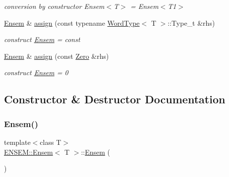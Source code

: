 \begin{DoxyCompactItemize}
\begin{DoxyCompactList}\small\item\em conversion by constructor Ensem$<$\+T$>$ = Ensem$<$\+T1$>$ \end{DoxyCompactList}\item 
\mbox{\hyperlink{classENSEM_1_1Ensem}{Ensem}} \& \mbox{\hyperlink{classENSEM_1_1Ensem_ae31c239c3dc966eaad70ec90489f5476}{assign}} (const typename \mbox{\hyperlink{structENSEM_1_1WordType}{Word\+Type}}$<$ T $>$\+::Type\+\_\+t \&rhs)
\begin{DoxyCompactList}\small\item\em construct \mbox{\hyperlink{classENSEM_1_1Ensem}{Ensem}} = const \end{DoxyCompactList}\item 
\mbox{\hyperlink{classENSEM_1_1Ensem}{Ensem}} \& \mbox{\hyperlink{classENSEM_1_1Ensem_a140d8bb94d07a0abfb2ad396df63c625}{assign}} (const \mbox{\hyperlink{structENSEM_1_1Zero}{Zero}} \&rhs)
\begin{DoxyCompactList}\small\item\em construct \mbox{\hyperlink{classENSEM_1_1Ensem}{Ensem}} = 0 \end{DoxyCompactList}\end{DoxyCompactItemize}


\subsection{Constructor \& Destructor Documentation}
\mbox{\label{classENSEM_1_1Ensem_a8875b85c5536f02d10db536a815984b6}} 
\subsubsection{\texorpdfstring{Ensem()}{Ensem()}\hspace{0.1cm}{\footnotesize\ttfamily [1/9]}}
{\footnotesize\ttfamily template$<$class T$>$ \\
\mbox{\hyperlink{classENSEM_1_1Ensem}{E\+N\+S\+E\+M\+::\+Ensem}}$<$ T $>$\+::\mbox{\hyperlink{classENSEM_1_1Ensem}{Ensem}} (\begin{DoxyParamCaption}{ }\end{DoxyParamCaption})\hspace{0.3cm}{\ttfamily [inline]}}

\mbox{\label{classENSEM_1_1Ensem_a01e4e19b101048ad2ffcf886017592c9}} 
